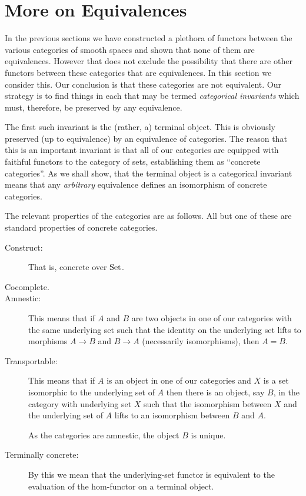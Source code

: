 \documentclass[%
a4paper,%
arxiv,%
defaults
]{myclass}
\begin{document}
\section{More on Equivalences}
\label{sec:equiv}

In the previous sections we have constructed a plethora of functors between the various categories of smooth spaces and shown that none of them are equivalences.
However that does not exclude the possibility that there are other functors between these categories that are equivalences.
In this section we consider this.
Our conclusion is that these categories are not equivalent.
Our strategy is to find things in each that may be termed \emph{categorical invariants} which must, therefore, be preserved by any equivalence.

The first such invariant is the (rather, a) terminal object.
This is obviously preserved (up to equivalence) by an equivalence of categories.
The reason that this is an important invariant is that all of our categories are equipped with faithful functors to the category of sets, establishing them as ``concrete categories''.
As we shall show, that the terminal object is a categorical invariant means that any \emph{arbitrary} equivalence defines an isomorphism of concrete categories.

The relevant properties of the categories are as follows.
All but one of these are standard properties of concrete categories.
%
\begin{description}
\item[Construct:] That is, concrete over \(\operatorname{Set}\).

\item[Cocomplete.]

\item[Amnestic:] This means that if \(A\) and \(B\) are two objects in one of our categories with the same underlying set such that the identity on the underlying set lifts to morphisms \(A \to B\) and \(B \to A\) (necessarily isomorphisms), then \(A = B\).

\item[Transportable:] This means that if \(A\) is an object in one of our categories and \(X\) is a set isomorphic to the underlying set of \(A\) then there is an object, say \(B\), in the category with underlying set \(X\) such that the isomorphism between \(X\) and the underlying set of \(A\) lifts to an isomorphism between \(B\) and \(A\).

As the categories are amnestic, the object \(B\) is unique.

\item[Terminally concrete:] By this we mean that the underlying\hyp{}set functor is equivalent to the evaluation of the hom\hyp{}functor on a terminal object.
\end{description}
\end{document}
